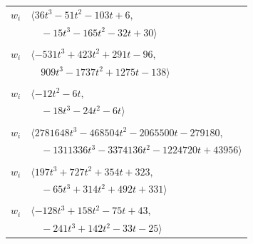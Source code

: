\documentclass[11pt]{article}
\begin{document}
\begin{longtable}{@{}ll@{}}
$w_i$ & $\langle 36t^{3}-51t^{2}-103t+6,$\\
 & $\quad -15t^{3}-165t^{2}-32t+30\rangle$\\
\addlinespace[2pt]
\multicolumn{2}{@{}p{0.97\textwidth}@{}}{$i=18$, $D_i=1$, $\rho_{ij}$: $11{:}1, \allowbreak 13{:}1, \allowbreak 14{:}2, \allowbreak 15{:}2, \allowbreak 16{:}2, \allowbreak 22{:}1, \allowbreak 23{:}1, \allowbreak 26{:}1, \allowbreak 29{:}1, \allowbreak 33{:}2, \allowbreak 74{:}1$}\\
$w_i$ & $\langle -531t^{3}+423t^{2}+291t-96,$\\
 & $\quad 909t^{3}-1737t^{2}+1275t-138\rangle$\\
\addlinespace[2pt]
\multicolumn{2}{@{}p{0.97\textwidth}@{}}{$i=19$, $D_i=3$, $\rho_{ij}$: $3{:}2, \allowbreak 14{:}2, \allowbreak 26{:}1, \allowbreak 44{:}2, \allowbreak 53{:}2$}\\
$w_i$ & $\langle -12t^{2}-6t,$\\
 & $\quad -18t^{3}-24t^{2}-6t\rangle$\\
\addlinespace[2pt]
\multicolumn{2}{@{}p{0.97\textwidth}@{}}{$i=20$, $D_i=3072$, $e_i=0$, $\rho_{ij}$: $3{:}1, \allowbreak 8{:}2, \allowbreak 9{:}1, \allowbreak 13{:}2, \allowbreak 14{:}2, \allowbreak 17{:}2, \allowbreak 23{:}1, \allowbreak 29{:}2, \allowbreak 37{:}2, \allowbreak 43{:}1, \allowbreak 47{:}1, \allowbreak 57{:}2$}\\
$w_i$ & $\langle 2781648t^{3}-468504t^{2}-2065500t-279180,$\\
 & $\quad -1311336t^{3}-3374136t^{2}-1224720t+43956\rangle$\\
\addlinespace[2pt]
\multicolumn{2}{@{}p{0.97\textwidth}@{}}{$i=21$, $D_i=81$, $\rho_{ij}$: $13{:}1, \allowbreak 17{:}2, \allowbreak 24{:}2, \allowbreak 29{:}2, \allowbreak 35{:}2, \allowbreak 36{:}1, \allowbreak 37{:}2, \allowbreak 46{:}1, \allowbreak 53{:}1, \allowbreak 60{:}1, \allowbreak 61{:}2$}\\
$w_i$ & $\langle 197t^{3}+727t^{2}+354t+323,$\\
 & $\quad -65t^{3}+314t^{2}+492t+331\rangle$\\
\addlinespace[2pt]
\multicolumn{2}{@{}p{0.97\textwidth}@{}}{$i=22$, $D_i=27$, $\rho_{ij}$: $12{:}2, \allowbreak 18{:}2, \allowbreak 30{:}2, \allowbreak 32{:}2, \allowbreak 48{:}1, \allowbreak 49{:}1, \allowbreak 55{:}2, \allowbreak 63{:}2, \allowbreak 67{:}1, \allowbreak 72{:}1$}\\
$w_i$ & $\langle -128t^{3}+158t^{2}-75t+43,$\\
 & $\quad -241t^{3}+142t^{2}-33t-25\rangle$\\

\end{longtable}
\end{document}
